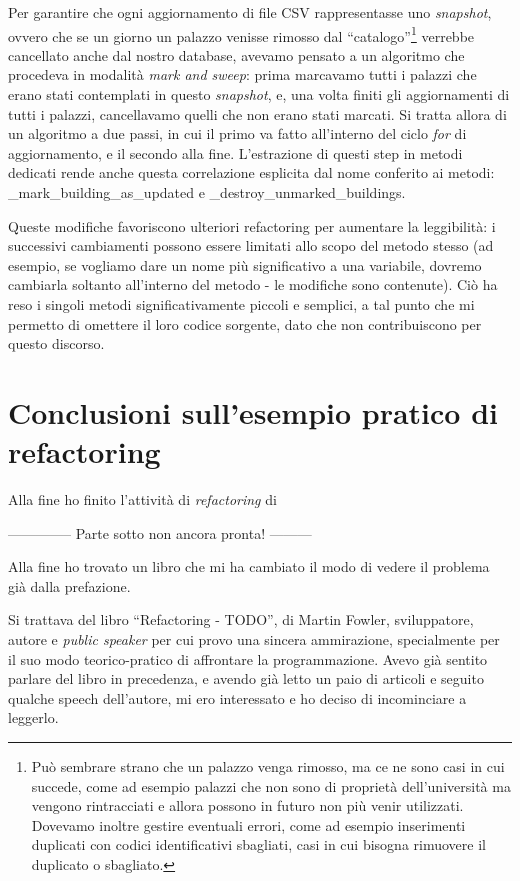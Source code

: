 \documentclass[12pt]{report}
\begin{document}
Per garantire che ogni aggiornamento di
file CSV rappresentasse uno \textit{snapshot}, ovvero che se un giorno un
palazzo venisse rimosso dal ``catalogo''\footnote{
Può sembrare strano che un palazzo venga rimosso, ma ce ne sono casi in cui
succede, come ad esempio palazzi che non sono di proprietà dell'università
ma vengono rintracciati e allora possono in futuro non più venir utilizzati. 
Dovevamo inoltre gestire eventuali errori, come ad esempio inserimenti duplicati
con codici identificativi sbagliati, casi in cui bisogna rimuovere il duplicato
o sbagliato.
}
verrebbe cancellato anche dal nostro database, avevamo pensato a un algoritmo
che procedeva in modalità \textit{mark and sweep}: prima marcavamo tutti i palazzi
che erano stati contemplati in questo \textit{snapshot}, e, una volta
finiti gli aggiornamenti di tutti i palazzi, cancellavamo quelli
che non erano stati marcati. Si tratta allora di un algoritmo a due passi,
in cui il primo va fatto all'interno del ciclo \textit{for} di aggiornamento, e il 
secondo alla fine. L'estrazione di questi step in metodi dedicati
rende anche questa correlazione esplicita dal nome conferito ai metodi:
\_mark\_building\_as\_updated e \_destroy\_unmarked\_buildings.

Queste modifiche favoriscono ulteriori refactoring per 
aumentare la leggibilità: i successivi cambiamenti possono 
essere limitati allo scopo del metodo stesso (ad esempio, 
se vogliamo dare un nome più significativo a una variabile, 
dovremo cambiarla soltanto all'interno del metodo - le modifiche sono
contenute). Ciò ha reso i singoli metodi significativamente piccoli e
semplici, a tal punto che mi permetto di omettere il loro codice sorgente,
dato che non contribuiscono per questo discorso.

\section{Conclusioni sull'esempio pratico di refactoring}
Alla fine ho finito l'attività di \textit{refactoring} di




-------------- Parte sotto non ancora pronta! ---------

Alla fine ho trovato un libro che mi ha cambiato il modo di vedere il problema 
già dalla prefazione.


Si trattava del libro ``Refactoring - TODO'', di Martin Fowler, sviluppatore, 
autore e \textit{public speaker} per cui provo una sincera ammirazione,
specialmente per il suo modo teorico-pratico di affrontare la programmazione. 
Avevo già sentito parlare del libro in precedenza, e avendo già letto un paio 
di articoli e seguito qualche speech dell'autore, mi ero interessato e 
ho deciso di incominciare a leggerlo. 
\end{document}

